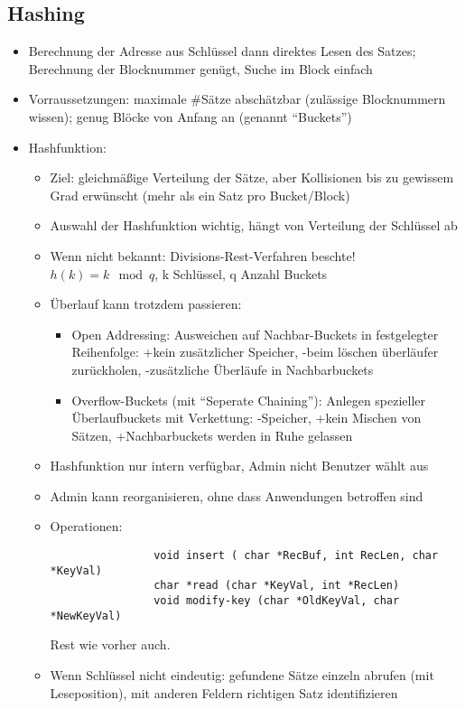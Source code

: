 \documentclass[a4paper, 12pt]{scrartcl}
\begin{document}
\subsection{Hashing}
\begin{itemize}
	\item
		Berechnung der Adresse aus Schlüssel dann direktes Lesen des Satzes; Berechnung der Blocknummer genügt, Suche im Block einfach
	\item
		Vorraussetzungen: maximale \#Sätze abschätzbar (zulässige Blocknummern wissen); genug Blöcke von Anfang an (genannt \enquote{Buckets})
	\item
		Hashfunktion:
		\begin{itemize}
			\item
				Ziel: gleichmäßige Verteilung der Sätze, aber Kollisionen bis zu gewissem Grad erwünscht (mehr als ein Satz pro Bucket/Block)
			\item Auswahl der Hashfunktion wichtig, hängt von Verteilung der Schlüssel ab
			\item
				Wenn nicht bekannt: Divisions-Rest-Verfahren beschte! $h(k) = k \mod q$, k Schlüssel, q Anzahl Buckets
			\item
				Überlauf kann trotzdem passieren:
				\begin{itemize}
					\item
						Open Addressing: Ausweichen auf Nachbar-Buckets in festgelegter Reihenfolge: +kein zusätzlicher Speicher, -beim löschen überläufer zurückholen, -zusätzliche Überläufe in Nachbarbuckets
					\item
						Overflow-Buckets (mit \enquote{Seperate Chaining}): Anlegen spezieller Überlaufbuckets mit Verkettung: -Speicher, +kein Mischen von Sätzen, +Nachbarbuckets werden in Ruhe gelassen
				\end{itemize}
			\item
				Hashfunktion nur intern verfügbar, Admin nicht Benutzer wählt aus
			\item
				Admin kann reorganisieren, ohne dass Anwendungen betroffen sind
			\item Operationen:
				\begin{lstlisting}
				void insert ( char *RecBuf, int RecLen, char *KeyVal)
				char *read (char *KeyVal, int *RecLen)
				void modify-key (char *OldKeyVal, char *NewKeyVal)
				\end{lstlisting}
				Rest wie vorher auch.
			\item
				Wenn Schlüssel nicht eindeutig: gefundene Sätze einzeln abrufen (mit Leseposition), mit anderen Feldern richtigen Satz identifizieren

\end{itemize}
\end{itemize}
\end{document}
